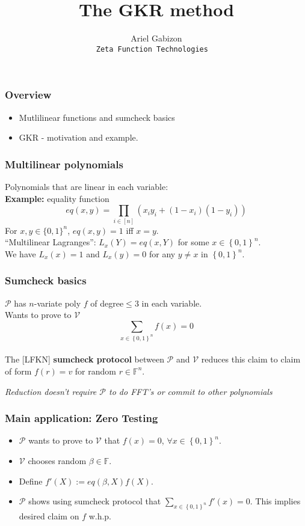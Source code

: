 \documentclass[shadesubsections,compress,14pt,mathserif]{beamer}
\title{\large{The GKR method}}    %
\author{\small{Ariel Gabizon}\\                 %
\tt{\footnotesize{Zeta Function Technologies}                                       } }      %
\date{}                    %
\newcommand{\F}{\ensuremath{{\mathbb F}}}
\newcommand{\set}[1]{\ensuremath{\left\{#1\right\}}}
\newcommand{\bin}{\ensuremath{\set{0,1}}}
\newcommand{\cube}{\ensuremath{\bin^n}}
\newcommand{\defeq}{\ensuremath{:=}}
\newcommand{\ver}{\ensuremath{\mathcal{V}}}
\newcommand{\prv}{\ensuremath{\mathcal{P}}}
\newcommand{\nl}{\\ \pause \vspace{0.2in}}
\begin{document}
\boldmath
\begin{frame}
  \titlepage
\end{frame}


\begin{frame}
 \frametitle{Overview}
 \begin{itemize}
  \item Mutlilinear functions and sumcheck basics
  \item GKR - motivation and example.
 \end{itemize}

\end{frame}


\begin{frame}
 \frametitle{Multilinear polynomials}
 Polynomials that are linear in each variable:\nl 
 \textbf{Example:}
 equality  function\pause
 \[eq(x,y)=\prod_{i\in [n]} (x_i y_i +(1-x_i)(1-y_i))\]\pause
For $x,y \in \{0,1\}^n$, $eq(x,y)=1$ iff $x=y$. \nl
 ``Multilinear Lagranges'': $L_x(Y)=eq(x,Y)$ for some $x\in \cube.$\nl
 We have $L_x(x)=1$ and $L_x(y)=0$ for any $y\neq x$ in $\cube$.
 
\end{frame}

\begin{frame}
 \frametitle{Sumcheck basics}
 $\prv$ has $n$-variate poly $f$ of degree$\leq 3$ in each variable.\nl
 Wants to prove to \ver
 \[\sum_{x\in\cube} f(x)=0\]\nl
 The {\small \color{green}[LFKN]} \textbf{sumcheck protocol} between $\prv$ and $\ver$ reduces this claim
 to claim of form $f(r)=v$ for random $r\in \F^n$.\nl
 
 \emph{Reduction doesn't require $\prv$ to do FFT's or commit to other polynomials }

\end{frame}
\begin{frame}
 \frametitle{Main application: Zero Testing}
 \begin{itemize}
  \item  $\prv$ wants to prove to $\ver$ that $f(x)=0$, $\forall x\in \cube$.\pause
  \item $\ver$ chooses random $\beta \in \F$.
  \item Define $f'(X)\defeq eq(\beta,X) f(X)$.\pause
  \item $\prv$ shows using sumcheck protocol that $\sum_{x\in \cube} f'(x)=0$. This implies desired claim on $f$ w.h.p.
  
 \end{itemize}

\end{frame}
\end{document}
